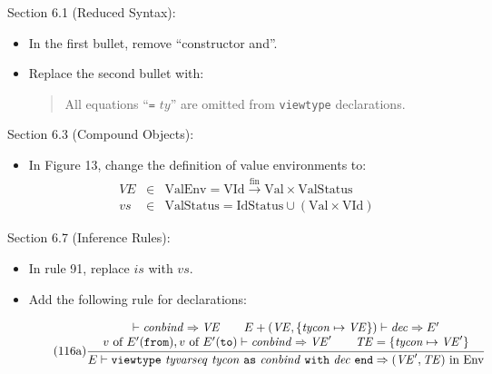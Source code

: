 \documentclass[twoside,titlepage]{article}
\newcommand{\finto}{\ensuremath{\xrightarrow{\text{fin}}}}
\begin{document}
\begin{appendix}
Section 6.1 (Reduced Syntax):
\begin{itemize}
\item In the first bullet, remove ``constructor and''.

\item Replace the second bullet with:
   \begin{quote}
   All equations ``{\tt=} $\mathit{ty}$'' are omitted from {\tt viewtype} declarations.
   \end{quote}
\end{itemize}

Section 6.3 (Compound Objects):
\begin{itemize}
\item In Figure 13, change the definition of value environments to:
  \begin{eqnarray*}
  \mathit{VE} &\in& \mbox{ValEnv} = \mbox{VId} \finto \mbox{Val} \times \mbox{ValStatus} \\
  \mathit{vs} &\in& \mbox{ValStatus} = \mbox{IdStatus} \cup (\mbox{Val} \times \mbox{VId})
  \end{eqnarray*}
\end{itemize}

Section 6.7 (Inference Rules):
\begin{itemize}
\item In rule 91, replace $\mathit{is}$ with $\mathit{vs}$.

\item Add the following rule for declarations:

  \begin{equation}
  \tag{116a}
  \frac{
  \begin{array}{@{}c@{}}
  \vdash \mathit{conbind} \Rightarrow \mathit{VE}
  \qquad
  E + (\mathit{VE},\{\mathit{tycon}\mapsto\mathit{VE}\}) \vdash \mathit{dec} \Rightarrow E'
  \\
  v~\mbox{of}~E'({\tt{from}}), v~\mbox{of}~E'({\tt{to}}) \vdash \mathit{conbind} \Rightarrow \mathit{VE}'
  \qquad
  \mathit{TE} = \{\mathit{tycon}\mapsto\mathit{VE}'\}
  \end{array}
  }{
  \begin{array}{@{}l@{}}
  E \vdash {\tt viewtype}~\mathit{tyvarseq}~\mathit{tycon}~{\tt as}~\mathit{conbind}~{\tt with}~\mathit{dec}~{\tt end} \Rightarrow \mbox{$(\mathit{VE}',\mathit{TE})$ in Env}
  \end{array}
  }
  \end{equation}


\end{itemize}
\end{appendix}
\end{document}
